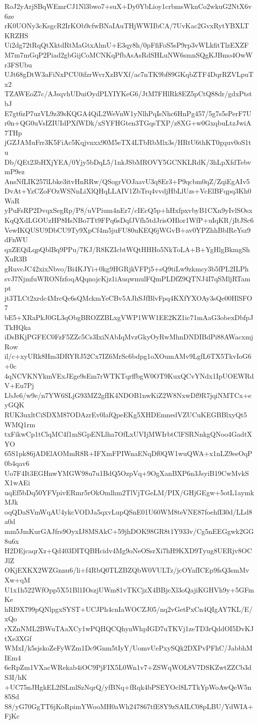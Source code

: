 RoJ2yArjSBqWEmrCJ1Nl3bwo7+suX+Dy0YbLioy1crbmsWknCo2wkuG2NtX6v6ze
rK0UONy3cKsgcR2IrKOb9cfwBNaIAuTHjWWIIbCA/7UvKac2GvxRytYBXLTKRZHS
Ui2dg72tRqQtXktdRtMaGtxAlmU+E3qy8h/0pFfiFoS5sP9rp3vWLkfitTlzEXZF
M7m7mGqP2Piad2gbGijCoMCNKqPfbAsAsRdSHLuNW6smnSQgKJBmo4OwWr3FSUbu
UJt68gDtW3aFiNxPCU0ifzrWvrXzBVXf/ac7nTK9bf89GKqbZTF4DqrRZVLpuTx2
TZAWEoZ7c/AJsqvhUDuiOydPLYIYKeG6/JtM7FHlRk8EZ5pCtQ88dr/gdxPtstbJ
E7gt6zP7uzVL9z39sKQGA4QiL2WeVnW1yNlhPqIsNhc6HnPg457/5g7s5sPerF7U
r0n+QG0uVsIZIUIdPXfWDk/xSYFHGten3TGqsTXP/z8XG+w0GxqbuLtzJwiA7THp
jGZJAMuFrr3K5FiAc5Kqjvnxx90M5eTX4LTbRbMlx3s/HRtU6thKT0gquv0oS1tu
Db/QEt23bHXjYEA/0Yjy5bDqL5/1nkJSbMROVY5GCNKLRdK/3hLpXfdTebvmP9ez
AnsNfLIK257lLbke3itvHnRRw/QSogrVOJaavU3q8Er3+P9qcbm0qZ/ZqiEgAIv5
DvAt+YzCZoFOzWSNnLiXlQHqLLAIV1ZbTrq4vvdjHbLlUzs+VcElBFqpq3Kh0WaR
yPuFsRP2DvqxSegRp/P8/uVPium4nEr7/cIEcQ5p+hHxfpxvbyB1CXn9yIvlSOsx
KqQXdLGOUzHP8HsNBo7Tt9FPq6sDqfJVfh5tdJrisOHlor1WfP+uIqKR/jItJSc6
VewIKQUSU9DbCU9Ty9XpCf4m5juFU80uKEQ6jWGvB+av0YPZhhBblReYsz9dFnWU
qxZEQiLqpQblBq9PPu/7KJ/R8KZIcbtWQtHHHo5NkToLA+B+YgHlgBkmgShXuR3B
gRuvcJC42xixNbvo/Bi4KJYi+0kg9HGRjkVFPj5+sQ9tiLw9zkmcy3b5fPL2ILPh
svJ7NjmfuWRONfzfoqAQqnojcKjz1iAuqwmulFQmPLDfZ9QTNJ4I7qSMljRTampt
jt3TLCt2xrdc4MrcQc6sQMckmYeCBv5AJhSJfBlvFpq4KXfYXOAy3sQe00HlSFO7
bE5+XRaPkJ0GL3qObgBROZZBLxgVWP1WW1EE2KZ1ic71mAaG3obexDbfpJTkHQka
iDsBKjPGFEC0FzF5ZZc5Cs3IxiNAbIqMvzGkyOyRwMhnDNDIBdPi88AWacxmjRow
il/c+xyURk8Hm3DRYRJ52Cx7IZ6MrSc6bdpg1oXOumAMv9LgfL6TX5TkvIoG6+0c
4qNCVKNYkmVExJEge9sEm7rWTKTqrffbgW0OT9KuxQCvYNdx1IpUOEWRdV+Eu7Pj
LbJe6/w9e/n7YW6SLjG93MZ2gfIK4NDOB1nwKiZ2W8NxwDf9R7jqiNMTCx+eyGQK
RUK3uxltCiSDXM87ODAzrEv0lafQpeEKg5XHDEmnedVZUCuKEGBBlxyQt5WMQ1rm
txFikwCp1tClqMC4f1mSGpENLlha7OfLxUVIjMWIrbtClFSRNnkgQNoo4GadtXYO
65S1pk86jADElAOMmR8R+IFXmFPIWnaENqDf0QW1wuQWA+x1nLZ9eeOqP0b4qav6
Uo7F4It3EGHnwYMGW98u7u1BdQ5OzpVq+9OgXanBXP6n3JsyiB19CwMvkSX1wAEi
uqEf5bDq50YFVpivERmr5rOkOmlhm2TlVjTGeLM/PIX/GHjGEgw+5otL1aymkMJk
oqQDaSVmWqAU4ykcVODJa5qxvLupQSnE01U60WM8teVNE87foehfI30d/LLd8a0d
mm5JmKurGAJfrs9OyxIJ8MSAkC+59jhDOK98GR8t1Y933v/Cg5nEEGgwk2GG8u6x
H2DEjcaqrXz+Qd403DITQBHcidv4Mg9oNeOSsrXi7hH9KXD9Tyug8UERjv8OCJlZ
OKjEXKX2WZGnnu6/li+f4RbQ0TLZBZQbW0VULTz/jcOYafICEp9fsQ3smMvXw+qM
U1x1h522WfOpp5X51Bl1IOszjUWm81vTKCjzX4BBjcXl3oQajiKGHVh9y+5GFmKe
hRI9X799pQNlpgxSYST+UCJPh4cnIaWOCZJ05/nq2vGetPxCn4QIgAY7KL/E/xQo
rXZnNML2BWuTAaXCy1wPQHQCQhynWhpIGD7uTKVj1zeTD3rQddOI5DvKJtXe3XGf
WMxI/k5sjskoZeFyWZm1Dc9Gnm5tIyY/UomvUePxySQk2DXPvPFhC/JabbhMIEm4
6eRpZm1VXacWRekab4iOC9PjFIX5L0Wn1v7+ZSWqWOL8V7DSKZwtZZCb3dS3I/hK
+UC75nJHgkEL2fSLmlSzNqrQ/yfBNq+fRqk4bPSEYOcl8L7TkYpWoAwQeW5n85Sd
S8/yG70GgTT6jKoRpimYWooMH0aWh247867tfE8Y9zSAILC08pLBU/YdWIA+FjKc

